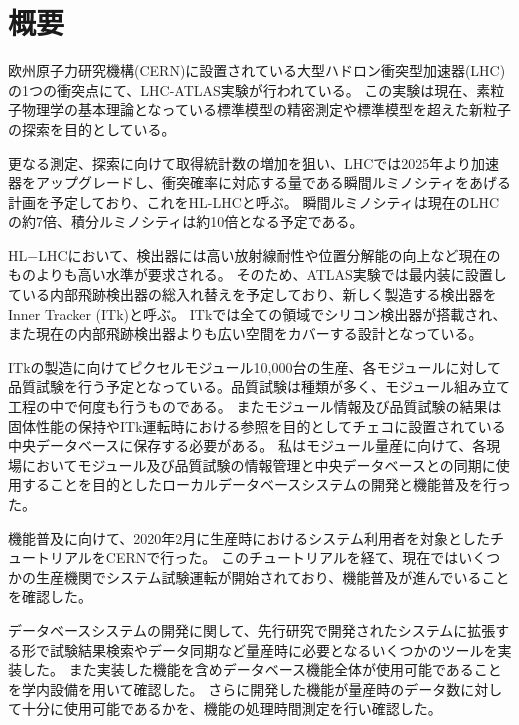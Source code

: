 \chapter*{概要}

欧州原子力研究機構(CERN)に設置されている大型ハドロン衝突型加速器(LHC)の1つの衝突点にて、LHC-ATLAS実験が行われている。
この実験は現在、素粒子物理学の基本理論となっている標準模型の精密測定や標準模型を超えた新粒子の探索を目的としている。

更なる測定、探索に向けて取得統計数の増加を狙い、LHCでは2025年より加速器をアップグレードし、衝突確率に対応する量である瞬間ルミノシティをあげる計画を予定しており、これをHL-LHCと呼ぶ。
瞬間ルミノシティは現在のLHCの約7倍、積分ルミノシティは約10倍となる予定である。

HL$-$LHCにおいて、検出器には高い放射線耐性や位置分解能の向上など現在のものよりも高い水準が要求される。
そのため、ATLAS実験では最内装に設置している内部飛跡検出器の総入れ替えを予定しており、新しく製造する検出器をInner Tracker (ITk)と呼ぶ。
ITkでは全ての領域でシリコン検出器が搭載され、また現在の内部飛跡検出器よりも広い空間をカバーする設計となっている。

ITkの製造に向けてピクセルモジュール10,000台の生産、各モジュールに対して品質試験を行う予定となっている。品質試験は種類が多く、モジュール組み立て工程の中で何度も行うものである。
またモジュール情報及び品質試験の結果は固体性能の保持やITk運転時における参照を目的としてチェコに設置されている中央データベースに保存する必要がある。
私はモジュール量産に向けて、各現場においてモジュール及び品質試験の情報管理と中央データベースとの同期に使用することを目的としたローカルデータベースシステムの開発と機能普及を行った。

機能普及に向けて、2020年2月に生産時におけるシステム利用者を対象としたチュートリアルをCERNで行った。
このチュートリアルを経て、現在ではいくつかの生産機関でシステム試験運転が開始されており、機能普及が進んでいることを確認した。

データベースシステムの開発に関して、先行研究で開発されたシステムに拡張する形で試験結果検索やデータ同期など量産時に必要となるいくつかのツールを実装した。
また実装した機能を含めデータベース機能全体が使用可能であることを学内設備を用いて確認した。
さらに開発した機能が量産時のデータ数に対して十分に使用可能であるかを、機能の処理時間測定を行い確認した。


